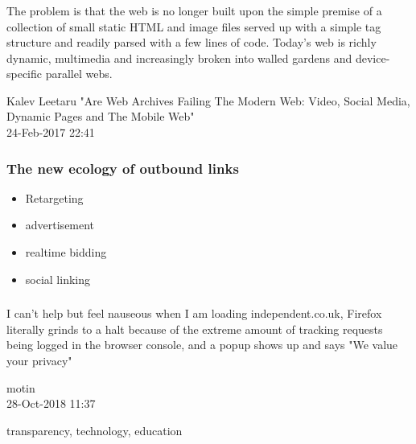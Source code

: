 \documentclass[aspectratio=169]{beamer}
\newcommand\blfootnote[1]{%
  \begingroup
  \renewcommand\thefootnote{}\footnote{#1}%
  \addtocounter{footnote}{-1}%
  \endgroup
}
\begin{document}
\begin{frame}
\frametitle{}
\epigraph{The problem is that the web is no longer built upon the simple premise of a collection of small static HTML and image files served up with a simple tag structure and readily parsed with a few lines of code. Today’s web is richly dynamic, multimedia and increasingly broken into walled gardens and device-specific parallel webs.}{Kalev Leetaru "Are Web Archives Failing The Modern Web: Video, Social Media, Dynamic Pages and The Mobile Web"\\ 24-Feb-2017 22:41}
% 
\end{frame}
\begin{frame}
\frametitle{The new ecology of outbound links}
\begin{itemize}
\item{Retargeting}
\item{advertisement}
\item{realtime bidding}
\item{social linking}
\end{itemize}
\end{frame}

\begin{frame}
\frametitle{}
\epigraph{I can't help but feel nauseous when I am loading independent.co.uk, Firefox literally grinds to a halt because of the extreme amount of tracking requests being logged in the browser console, and a popup shows up and says "We value your privacy"}{motin \\
28-Oct-2018 11:37}
\end{frame}

\begin{frame}
transparency, technology, education


\end{frame}
\end{document}
